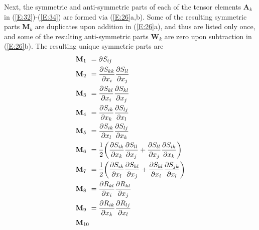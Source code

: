 Next, the symmetric and anti-symmetric parts of each of the tensor elements  $\mathbf{A}_k$in (\ref{E:32})-(\ref{E:34}) are formed via (\ref{E:26}a,b).  Some of the resulting symmetric parts $\mathbf{M}_k$  are duplicates upon addition in (\ref{E:26}a), and thus are listed only once, and some of the resulting anti-symmetric parts $\mathbf{W}_k$  are zero upon subtraction in (\ref{E:26}b).  The resulting unique symmetric parts are
%
\begin{subequations}
\label{E:36}
\begin{align}
	\mathmakebox[\widthof{$\mathbf{M}_{14}$}][l]{\mathbf{M}_1}  
	&= \partial S_{ij}  \\
	\mathmakebox[\widthof{$\mathbf{M}_{14}$}][l]{\mathbf{M}_2}
	&= \frac{\partial S_{kk}}{\partial x_i}
	   \frac{\partial S_{ll}}{\partial x_j} \\
	\mathmakebox[\widthof{$\mathbf{M}_{14}$}][l]{\mathbf{M}_3}
	&= \frac{\partial S_{kl}}{\partial x_i}
	   \frac{\partial S_{kl}}{\partial x_j} \\
	\mathmakebox[\widthof{$\mathbf{M}_{14}$}][l]{\mathbf{M}_4} 
	&= \frac{\partial S_{ik}}{\partial x_k}
	   \frac{\partial S_{lj}}{\partial x_l} \\
	\mathmakebox[\widthof{$\mathbf{M}_{14}$}][l]{\mathbf{M}_5}
	&= \frac{\partial S_{ik}}{\partial x_l}
	   \frac{\partial S_{lj}}{\partial x_k} \\
	\mathmakebox[\widthof{$\mathbf{M}_{14}$}][l]{\mathbf{M}_6}
	&= \frac{1}{2} 
			  \bigg( \frac{\partial S_{ik}}{\partial x_k}
					 \frac{\partial S_{ll}}{\partial x_j} 
				  	+ 
					 \frac{\partial S_{ll}}{\partial x_j} 
					 \frac{\partial S_{ik}}{\partial x_k} \bigg) \\
	\mathmakebox[\widthof{$\mathbf{M}_{10}$}][l]{\mathbf{M}_7}
	&= \frac{1}{2} 
			  \bigg( \frac{\partial S_{ik}}{\partial x_l}
					 \frac{\partial S_{kl}}{\partial x_j} 
				    + 
					 \frac{\partial S_{kl}}{\partial x_i} 
					 \frac{\partial S_{jk}}{\partial x_l} \bigg) \\
	\mathmakebox[\widthof{$\mathbf{M}_{10}$}][l]{\mathbf{M}_8}
	&= \frac{\partial R_{kl}}{\partial x_i}
	   \frac{\partial R_{kl}}{\partial x_j} \\
	\mathmakebox[\widthof{$\mathbf{M}_{10}$}][l]{\mathbf{M}_9}
	&= \frac{\partial R_{ik}}{\partial x_k}
	   \frac{\partial R_{lj}}{\partial x_l} \\
	\mathmakebox[\widthof{$\mathbf{M}_{10}$}][l]{\mathbf{M}_{10}}

\end{align}
\end{subequations}
